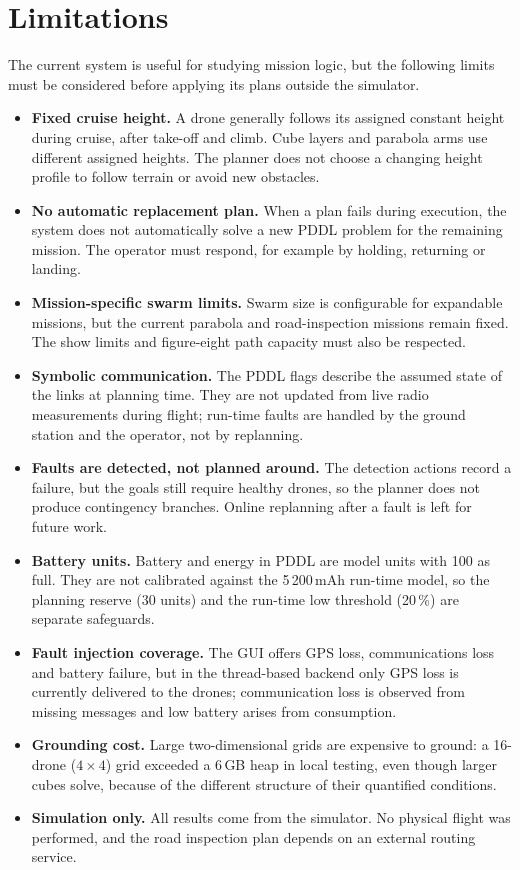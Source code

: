 \documentclass[11pt,a4paper,oneside]{report}
\begin{document}
\section{Limitations}
The current system is useful for studying mission logic, but the following limits
must be considered before applying its plans outside the simulator.
\begin{itemize}
  \item \textbf{Fixed cruise height.} A drone generally follows its assigned constant
        height during cruise, after take-off and climb. Cube layers and parabola arms
        use different assigned heights. The planner does not choose a changing height
        profile to follow terrain or avoid new obstacles.
  \item \textbf{No automatic replacement plan.} When a plan fails during execution,
        the system does not automatically solve a new PDDL problem for the remaining
        mission. The operator must respond, for example by holding, returning or landing.
  \item \textbf{Mission-specific swarm limits.} Swarm size is configurable for expandable
        missions, but the current parabola and road-inspection missions remain fixed.
        The show limits and figure-eight path capacity must also be respected.
  \item \textbf{Symbolic communication.} The PDDL flags describe the assumed state of the links at
        planning time. They are not updated from live radio measurements during flight; run-time
        faults are handled by the ground station and the operator, not by replanning.
  \item \textbf{Faults are detected, not planned around.} The detection actions record a failure,
        but the goals still require healthy drones, so the planner does not produce contingency
        branches. Online replanning after a fault is left for future work.
  \item \textbf{Battery units.} Battery and energy in PDDL are model units with 100 as full. They
        are not calibrated against the 5\,200\,mAh run-time model, so the planning reserve (30
        units) and the run-time low threshold (20\,\%) are separate safeguards.
  \item \textbf{Fault injection coverage.} The GUI offers GPS loss, communications loss and battery
        failure, but in the thread-based backend only GPS loss is currently delivered to the
        drones; communication loss is observed from missing messages and low battery arises from
        consumption.
  \item \textbf{Grounding cost.} Large two-dimensional grids are expensive to ground: a 16-drone
        ($4\times4$) grid exceeded a 6\,GB heap in local testing, even though larger cubes solve,
        because of the different structure of their quantified conditions.
  \item \textbf{Simulation only.} All results come from the simulator. No physical flight was
        performed, and the road inspection plan depends on an external routing service.
\end{itemize}
\end{document}
